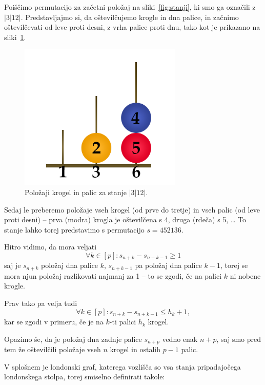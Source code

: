 \documentclass[twoside,11pt]{article}
\begin{document}
\begin{primer}
    Poiščimo permutacijo za začetni položaj na sliki~\ref{fig:stanji}, ki smo ga označili z $|3|12|$. 
    Predstavljajmo si, da oštevilčujemo krogle in dna palice, in začnimo oštevilčevati od leve proti desni, z vrha palice proti dnu, tako kot je prikazano na sliki~\ref{fig:ostev-stanji}.
    
    \begin{figure}[h]
        \centering
        \includegraphics[width=220pt]{img/london-tower-numbered.png}
        \caption{Položaji krogel in palic za stanje $|3|12|$.}
        \label{fig:ostev-stanji}
    \end{figure}
    
    Sedaj le preberemo položaje vseh krogel (od prve do tretje) in vseh palic (od leve proti desni) -- prva (modra) krogla je oštevilčena s 4, druga (rdeča) s 5, \ldots
    To stanje lahko torej predstavimo s permutacijo $s=452136$.
\end{primer}

Hitro vidimo, da mora veljati 
\[\forall k \in [p]\colon s_{n+k} - s_{n+k-1} \geq 1 \]
saj je $s_{n+k}$ položaj dna palice $k$, $s_{n+k-1}$ pa položaj dna palice $k-1$, torej se mora njun položaj razlikovati najmanj za 1 -- to se zgodi, če na palici $k$ ni nobene krogle.

Prav tako pa velja tudi 
\[\forall k \in [p]\colon s_{n+k} - s_{n+k-1} \leq h_k + 1,\]
kar se zgodi v primeru, če je na $k$-ti palici $h_k$ krogel.

Opazimo še, da je položaj dna zadnje palice $s_{n+p}$ vedno enak $n+p$, saj smo pred tem že oštevilčili položaje vseh $n$ krogel in ostalih $p-1$ palic.

V splošnem je londonski graf, katerega vozlišča so vsa stanja pripadajočega londonskega stolpa, torej smiselno definirati takole:
\end{document}
